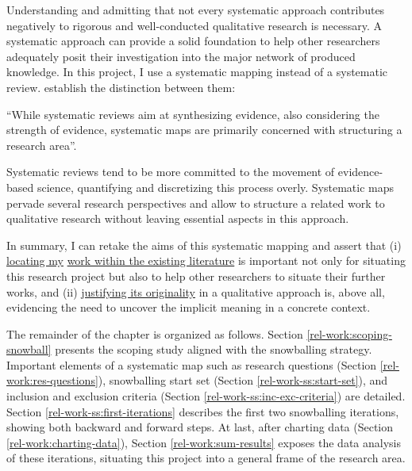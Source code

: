 Understanding and admitting that not every systematic approach contributes negatively to rigorous and well-conducted qualitative research is necessary. A systematic approach can provide a solid foundation to help other researchers adequately posit their investigation into the major network of produced knowledge. In this project, I use a systematic mapping instead of a systematic review.  establish the distinction between them:
\begin{citacao}
    “While systematic reviews aim at synthesizing evidence, also considering the strength of evidence, systematic maps are primarily concerned with structuring a research area”.    
\end{citacao}

Systematic reviews tend to be more committed to the movement of evidence-based science, quantifying and discretizing this process overly. Systematic maps pervade several research perspectives and allow to structure a related work to qualitative research without leaving essential aspects in this approach.

In summary, I can retake the aims of this systematic mapping and assert that (i) \underline{locating my} \underline{work within the existing literature} is important not only for situating this research project but also to help other researchers to situate their further works, and (ii) \underline{justifying its originality} in a qualitative approach is, above all, evidencing the need to uncover the implicit meaning in a concrete context. 

The remainder of the chapter is organized as follows. Section \ref{rel-work:scoping-snowball} presents the scoping study aligned with the snowballing strategy. Important elements of a systematic map such as research questions (Section \ref{rel-work:res-questions}), snowballing start set (Section \ref{rel-work-ss:start-set}), and inclusion and exclusion criteria (Section \ref{rel-work-ss:inc-exc-criteria}) are detailed. Section \ref{rel-work-ss:first-iterations} describes the first two snowballing iterations, showing both backward and forward steps. At last, after charting data (Section \ref{rel-work:charting-data}), Section \ref{rel-work:sum-results} exposes the data analysis of these iterations, situating this project into a general frame of the research area.
